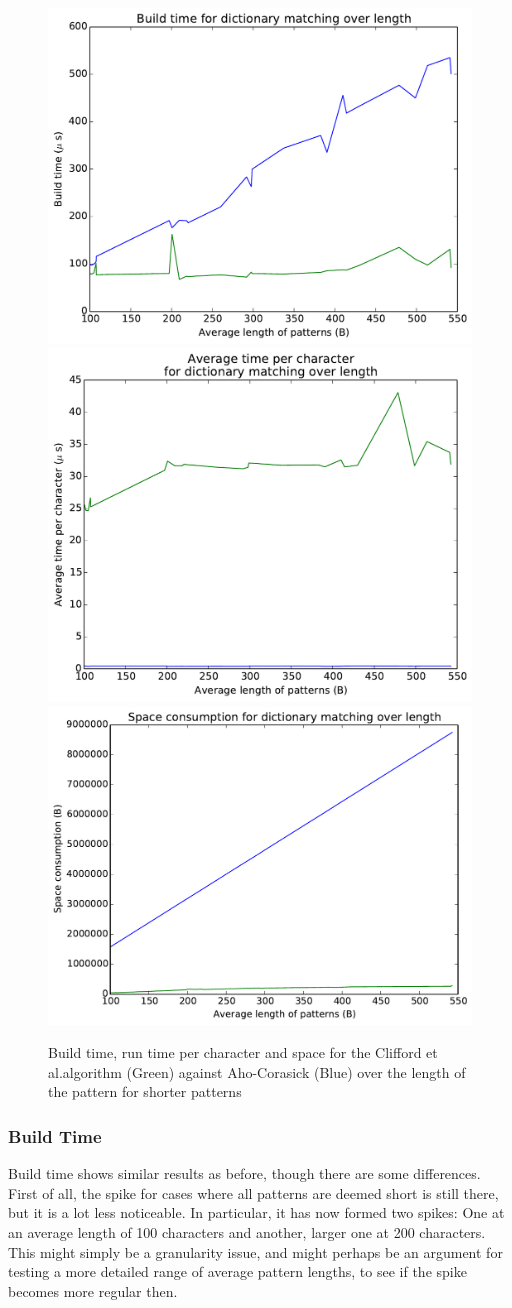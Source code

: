 \documentclass[ %
                    author={Dominic Joseph Moylett},
                    degree={MEng},
                     title={Dictionary Matching with Fingerprints},
                  subtitle={An Empirical Analysis},
                      type={research},
                      year={2015} ]{dissertation}
\begin{document}
\begin{figure}[t]
\begin{center}
  \includegraphics[width=0.5\linewidth]{build_length_200_1000}\\
  \includegraphics[width=0.5\linewidth]{time_length_200_1000}\includegraphics[width=0.5\linewidth]{size_length_200_1000}
\end{center}
\caption{Build time, run time per character and space for the Clifford et al.\@ algorithm (Green) against Aho-Corasick (Blue) over the length of the pattern for shorter patterns}
\label{fig:short-pattern-results}
\end{figure}

\subsubsection{Build Time}

Build time shows similar results as before, though there are some differences. First of all, the spike for cases where all patterns are deemed short is still there, but it is a lot less noticeable. In particular, it has now formed two spikes: One at an average length of 100 characters and another, larger one at 200 characters. This might simply be a granularity issue, and might perhaps be an argument for testing a more detailed range of average pattern lengths, to see if the spike becomes more regular then.
\end{document}
